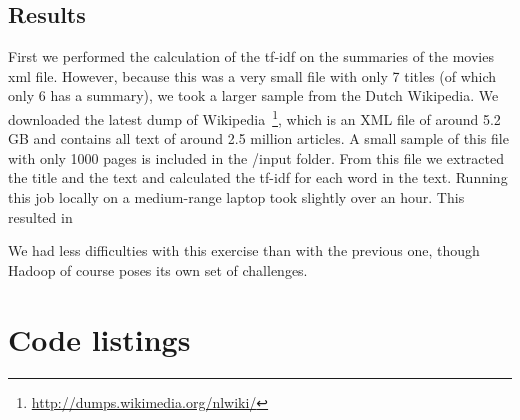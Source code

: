 \documentclass[11pt]{article}
\begin{document}
\subsection{Results}
First we performed the calculation of the tf-idf on the summaries of the movies xml file. However, because this was a very small file with only 7 titles (of which only 6 has a summary), we took a larger sample from the Dutch Wikipedia. We downloaded the latest dump of Wikipedia~\footnote{\url{http://dumps.wikimedia.org/nlwiki/}}, which is an XML file of around 5.2 GB and contains all text of around 2.5 million articles. A small sample of this file with only 1000 pages is included in the /input folder. From this file we extracted the title and the text and calculated the tf-idf for each word in the text. Running this job locally on a medium-range laptop took slightly over an hour. This resulted in 


We had less difficulties with this exercise than with the previous one, though Hadoop of course poses its own set of challenges. 


\section{Code listings}





\end{document}
